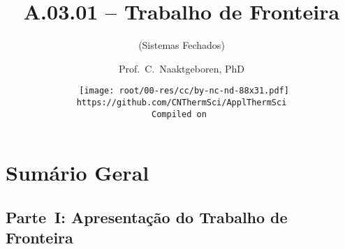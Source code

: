 \makeatletter
\immediate{} %
\makeatother


\title{A.03.01 -- Trabalho de Fronteira}
\subtitle{(Sistemas Fechados)}
\author{Prof.~C.~Naaktgeboren, PhD}
\date{{\scriptsize\tt%
    \texttt{[image: root/00-res/cc/by-nc-nd-88x31.pdf]}\\[\smallskipamount]
    https://github.com/CNThermSci/ApplThermSci\\
    Compiled on 
}}

\logo{%
    \parbox{158mm}{%
        \texttt{[image: root/00-res/UTFPR/UTFPR-logo-A.pdf]}\hfill%
        \texttt{[image: root/00-res/logo/CNThermSci-logo-A.pdf]}%
}} %
\frame{\titlepage}

\section*{Sumário Geral}

\subsection{Parte~I: Apresentação do Trabalho de Fronteira}

